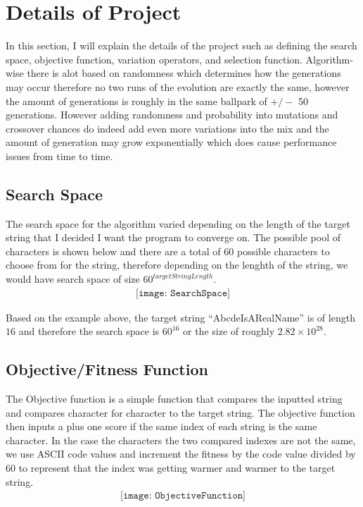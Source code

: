 \documentclass[paper=a4, fontsize=11pt]{scrartcl}
\numberwithin{equation}{section}		%
\numberwithin{figure}{section}			%
\numberwithin{table}{section}				%
\begin{document}
    \section{Details of Project}
    In this section, I will explain the details of the project such as defining the search space, objective function,
    variation operators, and selection function.  Algorithm-wise there is alot based on randomness which determines
    how the generations may occur therefore no two runs of the evolution are exactly the same, however the amount of 
    generations is roughly in the same ballpark of $+/-$ 50 generations.  However adding randomness and probability 
    into mutations and crossover chances do indeed add even more variations into the mix and the amount of generation
    may grow exponentially which does cause performance issues from time to time.


    \subsection{Search Space}
    The search space for the algorithm varied depending on the length of the target string that I decided I want the 
    program to converge on.  The possible pool of characters is shown below and there are a total of 60 possible characters
    to choose from for the string, therefore depending on the lenghth of the string, we would have search space of size
    $60^{targetStringLength}$.
    \begin{align} 
        \texttt{[image: SearchSpace]}				
    \end{align}

    Based on the example above, the target string ``AbcdeIsARealName'' is of length $16$ and therefore the search space
    is $60^{16}$ or the size of roughly $2.82\times10^{28}$.
    
    \subsection{Objective/Fitness Function}
    The Objective function is a simple function that compares the inputted string and compares character for character
    to the target string.  The objective function then inputs a plus one score if the same index of each string is the 
    same character.  In the case the characters the two compared indexes are not the same, we use ASCII code values and increment
    the fitness by the code value divided by 60 to represent that the index was getting warmer and warmer to the target string.
    \begin{align} 
        \texttt{[image: ObjectiveFunction]}				
    \end{align}
\end{document}
